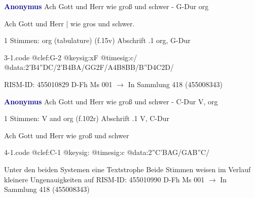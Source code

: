 \documentclass[twocolumn]{book}
\begin{document}
\newline \par \vspace{7pt} \textcolor{darkblue}{\textbf{Anonymus  }}
\newline Ach Gott und Herr wie groß und schwer - G-Dur
\newline org
\newline \begin{itshape}[f.15v, at left:] Ach Gott und Herr | wie gros und schwer.\end{itshape} 
\newline \textcolor{darkblue}{}  1 Stimmen: org (tabulature)  (f.15v)
\newline Abschrift
.1  org, G-Dur  
\begin{filecontents*}{3-1.code}
@clef:G-2
@keysig:xF
@timesig:c/
@data:2'B4''DC/2'B4BA/GG2F/A4B{8BB}/{B''D}4C2D/
\end{filecontents*}
\newline
%
\newline RISM-ID: 455010829
\newline D-Fh  Ms 001
\newline $\rightarrow$ In Sammlung 418 (455008343)
      
\newline \par \vspace{7pt} \textcolor{darkblue}{\textbf{Anonymus  }}
\newline Ach Gott und Herr wie groß und schwer - C-Dur
\newline V, org
\newline \begin{itshape}\end{itshape} 
\newline \textcolor{darkblue}{}  1 Stimmen: V and org  (f.102r)
\newline Abschrift
.1  V, C-Dur
\newline \begin{footnotesize} Ach Gott und Herr wie groß und schwer \end{footnotesize}  
\begin{filecontents*}{4-1.code}
@clef:C-1
@keysig:
@timesig:c
@data:2''C'BAG/GAB''C/
\end{filecontents*}
\newline
%
\newline Unter den beiden Systemen eine Textstrophe
\newline Beide Stimmen weisen im Verlauf kleinere Ungenauigkeiten auf
\newline RISM-ID: 455010990
\newline D-Fh  Ms 001
\newline $\rightarrow$ In Sammlung 418 (455008343)
      
\end{document}
